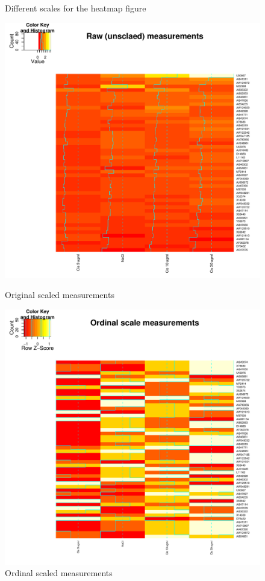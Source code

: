 \documentclass[12pt, oneside, letterpaper]{article}
\begin{document}
\begin{itemize}
\begin{figure}[p]
\caption{Different scales for the heatmap figure}
\end{figure}



\begin{figure}[p]
\begin{minipage}[t]{2.5in}
\centering
\includegraphics[width=\textwidth]{origScale}
\caption{Original scaled measurements}
\label{Original scaled intensities}
\end{minipage}
\hfill
\begin{minipage}[t]{2.5in}
\centering
\includegraphics[width=\textwidth]{ordinal}
\caption{Ordinal scaled measurements}
\label{Ordinal scaled intensities}
\end{minipage}
\end{figure}


\end{itemize}
\end{document}
